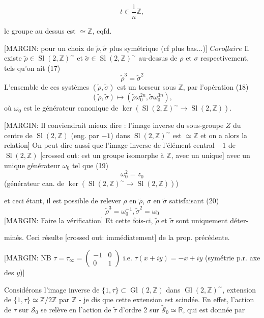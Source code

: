 \newpage


$$t \in \frac{1}{n} \mathbb{Z},$$

le groupe au dessus est $\simeq \mathbb{Z}$, cqfd.

[MARGIN: pour un choix de $\tilde{\rho}, \tilde{\sigma}$ plus symétrique (cf plus bas...)]
$\underline{Corollaire}$ Il existe $\tilde{\rho} \in \operatorname{Sl}(2,\mathbb{Z})^\sim$ et $\tilde{\sigma} \in \operatorname{Sl}(2,\mathbb{Z})^\sim$
au-dessus de $\rho$ et $\sigma$ respectivement, tels
qu'on ait
(17) $$\tilde{\rho}^3 = \tilde{\sigma}^2$$
L'ensemble de ces systèmes $(\tilde{\rho}, \tilde{\sigma})$ est un torseur
sous $\mathbb{Z}$, par l'opération
(18) $$(\tilde{\rho}, \tilde{\sigma}) \longmapsto (\tilde{\rho} \omega_0^{2n}, \tilde{\sigma} \omega_0^{3n}),$$
où $\omega_0$ est le générateur canonique de
$\ker( \operatorname{Sl}(2,\mathbb{Z})^\sim \to \operatorname{Sl}(2,\mathbb{Z}) )$.

[MARGIN: Il conviendrait mieux dire : l'image inverse du sous-groupe $Z$ du centre de $\operatorname{Sl}(2,\mathbb{Z})$ (eng. par $-1$) dans $\operatorname{Sl}(2,\mathbb{Z})^\sim$ est $\simeq \mathbb{Z}$ et on a alors la relation]
On peut dire aussi que l'image
inverse de l'élément central $-1$ de $\operatorname{Sl}(2,\mathbb{Z})$
[crossed out: est un groupe isomorphe à $\mathbb{Z}$, avec un unique]
avec un unique générateur $\omega_0$ tel que
(19) $$\omega_0^2 = z_0$$ (générateur can. de $\ker(\operatorname{Sl}(2,\mathbb{Z})^\sim \to \operatorname{Sl}(2,\mathbb{Z}))$)

et ceci étant, il est possible de
relever $\rho$ en $\tilde{\rho}$, $\sigma$ en $\tilde{\sigma}$ satisfaisant
(20) $$\tilde{\rho}^3 = \omega_0^{-1}, \tilde{\sigma}^2 = \omega_0$$
[MARGIN: Faire la vérification]
Et cette fois-ci, $\tilde{\rho}$ et $\tilde{\sigma}$ sont uniquement déter-

\newpage


minés. Ceci résulte [crossed out: immédiatement] de la prop. précédente.

[MARGIN: NB $\tau = \tau_\infty = \begin{pmatrix} -1 & 0 \\ 0 & 1 \end{pmatrix}$ i.e. $\tau(x+iy) = -x+iy$ (symétrie p.r. axe des $y$)]

Considérons l'image inverse de $\{1, \tau\} \subset \operatorname{Gl}(2,\mathbb{Z})$ dans $\operatorname{Gl}(2,\mathbb{Z})^\sim$, extension de $\{1, \tau\} \simeq \mathbb{Z}/2\mathbb{Z}$ par $\mathbb{Z}$ - je dis que cette extension est scindée. En effet, l'action de $\tau$ sur $\mathcal{S}_0$ se relève en l'action de $\tilde{\tau}$ d'ordre 2 sur $\tilde{\mathcal{S}}_0 \simeq \mathbb{R}$, qui est donnée par

